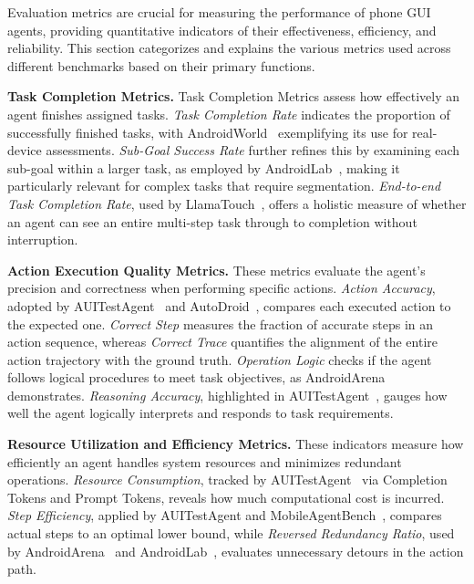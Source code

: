 Evaluation metrics are crucial for measuring the performance of phone GUI agents, providing quantitative indicators of their effectiveness, efficiency, and reliability. This section categorizes and explains the various metrics used across different benchmarks based on their primary functions.

\noindent\textbf{Task Completion Metrics.}
Task Completion Metrics assess how effectively an agent finishes assigned tasks. \emph{Task Completion Rate} indicates the proportion of successfully finished tasks, with AndroidWorld~\cite{rawles2024androidworld} exemplifying its use for real-device assessments. \emph{Sub-Goal Success Rate} further refines this by examining each sub-goal within a larger task, as employed by AndroidLab~\cite{xu2024androidlab}, making it particularly relevant for complex tasks that require segmentation. \emph{End-to-end Task Completion Rate}, used by LlamaTouch~\cite{zhang2024llamatouch}, offers a holistic measure of whether an agent can see an entire multi-step task through to completion without interruption.

\noindent\textbf{Action Execution Quality Metrics.}
These metrics evaluate the agent’s precision and correctness when performing specific actions. \emph{Action Accuracy}, adopted by AUITestAgent~\cite{hu2024auitestagent} and AutoDroid~\cite{zhang2023youautoui}, compares each executed action to the expected one. \emph{Correct Step} measures the fraction of accurate steps in an action sequence, whereas \emph{Correct Trace} quantifies the alignment of the entire action trajectory with the ground truth. \emph{Operation Logic} checks if the agent follows logical procedures to meet task objectives, as AndroidArena~\cite{xing2024AndroidArena} demonstrates. \emph{Reasoning Accuracy}, highlighted in AUITestAgent~\cite{hu2024auitestagent}, gauges how well the agent logically interprets and responds to task requirements.

\noindent\textbf{Resource Utilization and Efficiency Metrics.}
These indicators measure how efficiently an agent handles system resources and minimizes redundant operations. \emph{Resource Consumption}, tracked by AUITestAgent~\cite{hu2024auitestagent} via Completion Tokens and Prompt Tokens, reveals how much computational cost is incurred. \emph{Step Efficiency}, applied by AUITestAgent and MobileAgentBench~\cite{wang2024mobileagentbench}, compares actual steps to an optimal lower bound, while \emph{Reversed Redundancy Ratio}, used by AndroidArena~\cite{xing2024AndroidArena} and AndroidLab~\cite{xu2024androidlab}, evaluates unnecessary detours in the action path.

